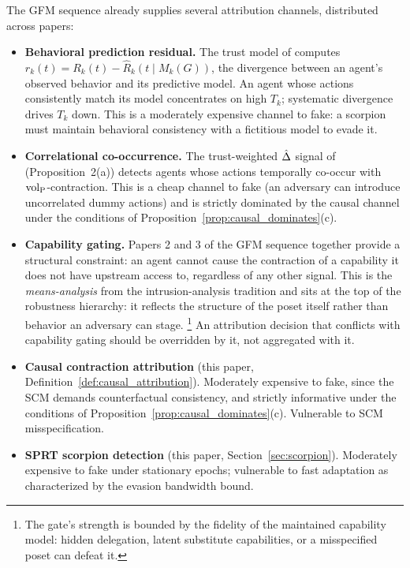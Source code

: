 The GFM sequence already supplies several attribution channels,
distributed across papers:
\begin{itemize}
\item \textbf{Behavioral prediction residual.} The trust model of
    \citet{lasser2026gfm} computes $r_k(t) = R_k(t) - \hat{R}_k(t
    \mid M_k(G))$, the divergence between an agent's observed
    behavior and its predictive model. An agent whose actions
    consistently match its model concentrates on high $T_k$;
    systematic divergence drives $T_k$ down. This is a moderately
    expensive channel to fake: a scorpion must maintain behavioral
    consistency with a fictitious model to evade it.
\item \textbf{Correlational co-occurrence.} The trust-weighted
    $\hat{\Delta}$ signal of \citet{lasser2026gfm} (Proposition~2(a))
    detects agents whose actions temporally co-occur with
    ${\operatorname{vol}_{\mathrm{P}}}$-contraction. This is a cheap channel to fake
    (an adversary can introduce uncorrelated dummy actions) and is
    strictly dominated by the causal channel under the conditions of
    Proposition~\ref{prop:causal_dominates}(c).
\item \textbf{Capability gating.} Papers 2 and 3 of the GFM sequence
    \citep{lasser2026poset, lasser2026horizon} together provide a
    structural constraint: an agent cannot cause the contraction of
    a capability it does not have upstream access to, regardless of
    any other signal. This is the \emph{means-analysis} from the
    intrusion-analysis tradition and sits at the top of the
    robustness hierarchy: it reflects the structure of the poset
    itself rather than behavior an adversary can stage.%
    \footnote{The gate's strength is bounded by the fidelity of the
    maintained capability model: hidden delegation, latent substitute
    capabilities, or a misspecified poset can defeat it.}
    An attribution decision that conflicts with capability gating
    should be overridden by it, not aggregated with it.
\item \textbf{Causal contraction attribution} (this paper,
    Definition~\ref{def:causal_attribution}). Moderately expensive to
    fake, since the SCM demands counterfactual consistency, and
    strictly informative under the conditions of
    Proposition~\ref{prop:causal_dominates}(c). Vulnerable to SCM
    misspecification.
\item \textbf{SPRT scorpion detection} (this paper,
    Section~\ref{sec:scorpion}). Moderately expensive to fake under
    stationary epochs; vulnerable to fast adaptation as characterized
    by the evasion bandwidth bound.
\end{itemize}

